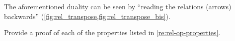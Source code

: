 \begin{marginfigure}
    \centering
    \caption{}
    \label{fig:rel_transpose_bis}
\end{marginfigure}

\begin{remark}
    The aforementioned duality can be seen by ``reading the relations (arrows) backwards'' (\cref{fig:rel_transpose,fig:rel_transpose_bis}).
\end{remark}

\vfill
\begin{gradedexercise}
    \label{ex:RelProperties}
    Provide a proof of each of the properties listed in \cref{re:rel-op-properties}.
\end{gradedexercise}

